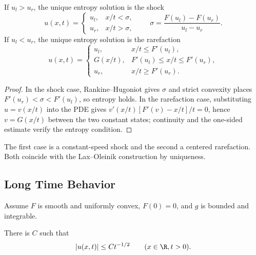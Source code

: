 \begin{theorem}
\label{thm:riemann-problem-solution}
If $u_l>u_r$, the unique entropy solution is the shock
\[
u(x,t)=\begin{cases}u_l,&x/t<\sigma,\\u_r,&x/t>\sigma,\end{cases}
\qquad \sigma=\frac{F(u_l)-F(u_r)}{u_l-u_r}.
\]
If $u_l<u_r$, the unique entropy solution is the rarefaction
\[
u(x,t)=\begin{cases}
u_l,&x/t\le F'(u_l),\\
G(x/t),&F'(u_l)\le x/t\le F'(u_r),\\
u_r,&x/t\ge F'(u_r).
\end{cases}
\]
\end{theorem}

\begin{proof}
\sketch In the shock case, Rankine--Hugoniot gives $\sigma$ and strict
convexity places $F'(u_r)<\sigma<F'(u_l)$, so entropy holds. In the rarefaction
case, substituting $u=v(x/t)$ into the PDE gives
$v'(x/t)[F'(v)-x/t]/t=0$, hence $v=G(x/t)$ between the two constant states;
continuity and the one-sided estimate verify the entropy condition.
\end{proof}

\begin{remark}
\label{rem:riemann-problem-shock-vs-rarefaction}
The first case is a constant-speed shock and the second a centered
rarefaction. Both coincide with the Lax--Oleinik construction by uniqueness.
\end{remark}

\subsection{Long Time Behavior}
\label{sec:conservation-laws-long-time-behavior}

Assume $F$ is smooth and uniformly convex, $F(0)=0$, and $g$ is bounded and
integrable.

\begin{theorem}
\label{thm:asymptotics-sup-norm}
There is $C$ such that
\[
|u(x,t)|\le Ct^{-1/2}\qquad(x\in\R,t>0).
\]
\end{theorem}

